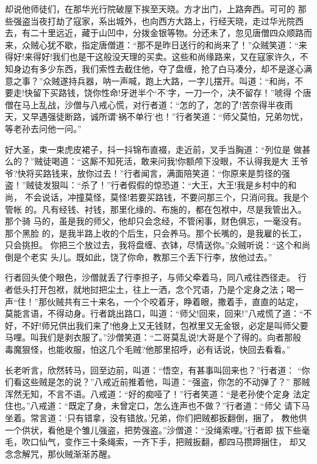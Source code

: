却说他师徒们，在那华光行院破屋下挨至天晓。方才出门，上路奔西。可可的
那些强盗当夜打劫了寇家，系出城外，也向西方大路上，行经天晓，走过华光院西
去，有二十里远近，藏于山凹中，分拨金银等物。分还未了，忽见唐僧四众顺路而
来，众贼心犹不歇，指定唐僧道：“那不是昨日送行的和尚来了！”众贼笑道：“来
得好!来得好!我们也是干这般没天理的买卖。这些和尚缘路来，又在寇家许久，不
知身边有多少东西，我们索性去截住他，夺了盘缠，抢了白马凑分，却不是遂心满
意之事？”众贼遂持兵器，呐一声喊，跑上大路，一字儿摆开。叫道：“和尚，不
要走!快留下买路钱，饶你性命!牙迸半个‘不’字，一刀一个，决不留存！”唬得
个唐僧在马上乱战，沙僧与八戒心慌，对行者道：“怎的了，怎的了!苦奈得半夜雨
天，又早遇强徒断路，诚所谓‘祸不单行’也！”行者笑道：“师父莫怕，兄弟勿忧，
等老孙去问他一问。”

好大圣，束一束虎皮裙子，抖一抖锦布直裰，走近前，叉手当胸道：“列位是
做甚么的？”贼徒喝道：“这厮不知死活，敢来问我!你额颅下没眼，不认得我是大
王爷爷?快将买路钱来，放你过去！”行者闻言，满面陪笑道：“你原来是剪径的强
盗！”贼徒发狠叫：“杀了！”行者假假的惊恐道：“大王，大王!我是乡村中的和尚，
不会说话，冲撞莫怪，莫怪!若要买路钱，不要问那三个，只消问我。我是个管帐
的。凡有经钱、衬钱，那里化缘的、布施的，都在包袱中，尽是我管出入。那个骑
马的，虽是我的师父，他却只会念经，不管闲事，财色俱忘，一毫没有。那个黑脸
的，是我半路上收的个后生，只会养马。那个长嘴的，是我雇的长工，只会挑担。
你把三个放过去，我将盘缠、衣钵，尽情送你。”众贼听说：“这个和尚倒是个老实
头儿。既如此，饶了你命，教那三个丢下行李，放他过去。”

行者回头使个眼色，沙僧就丢了行李担子，与师父牵着马，同八戒往西径走。
行者低头打开包袱，就地挝把尘土，往上一洒，念个咒语，乃是个定身之法；喝一
声“住！”那伙贼共有三十来名，一个个咬着牙，睁着眼，撒着手，直直的站定，
莫能言语，不得动身。行者跳出路口，叫道：“师父!回来，回来!”八戒慌了道：“不
好，不好!师兄供出我们来了!他身上又无钱财，包袱里又无金银，必定是叫师父要
马哩。叫我们是剥衣服了。”沙僧笑道：“二哥莫乱说!大哥是个了得的。向者那般
毒魔狠怪，也能收服，怕这几个毛贼?他那里招呼，必有话说，快回去看看。”

长老听言，欣然转马，回至边前，叫道：“悟空，有甚事叫回来也？”行者道：
“你们看这些贼是怎的说？”八戒近前推着他，叫道：“强盗，你怎的不动弹了？”
那贼浑然无知，不言不语。八戒道：“好的痴哑了！”行者笑道：“是老孙使个定身
法定住也。”八戒道：“既定了身，未曾定口，怎么连声也不做？”行者道：“师父
请下马坐着。常言道：‘只有错拿，没有错放。’兄弟，你们把贼都扳翻倒，捆了，
教他供一个供状，看他是个雏儿强盗，把势强盗。”沙僧道：“没绳索哩。”行者即
拔下些毫毛，吹口仙气，变作三十条绳索，一齐下手，把贼扳翻，都四马攒蹄捆住，
却又念念解咒，那伙贼渐渐苏醒。

